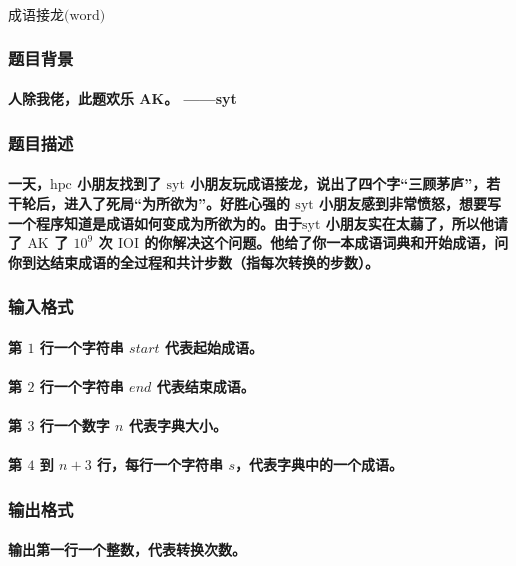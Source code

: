 \documentclass[final,11pt,oneside,UTF8]{report}
\begin{document}
\centerline{\LARGE{$\textbf{成语接龙}\text{(word)}$}}
\subsubsection{题目背景}
\paragraph{人除我佬，此题欢乐 AK。 ——syt}
\subsubsection{题目描述}
\paragraph{一天，$\text{hpc}$ 小朋友找到了 $\text{syt}$ 小朋友玩成语接龙，说出了四个字“三顾茅庐”，若干轮后，进入了死局“为所欲为”。好胜心强的 $\text{syt}$ 小朋友感到非常愤怒，想要写一个程序知道是成语如何变成为所欲为的。由于$\text{syt}$ 小朋友实在太蒻了，所以他请了 $\text{AK}$ 了 $10^9$ 次 $\text{IOI}$ 的你解决这个问题。他给了你一本成语词典和开始成语，问你到达结束成语的全过程和共计步数（指每次转换的步数）。}
\subsubsection{输入格式}
\paragraph{第 $1$ 行一个字符串 $start$ 代表起始成语。}
\paragraph{第 $2$ 行一个字符串 $end$ 代表结束成语。}
\paragraph{第 $3$ 行一个数字 $n$ 代表字典大小。}
\paragraph{第 $4$ 到 $n+3$ 行，每行一个字符串 $s$，代表字典中的一个成语。}
\subsubsection{输出格式}
\paragraph{输出第一行一个整数，代表转换次数。}
\end{document}
